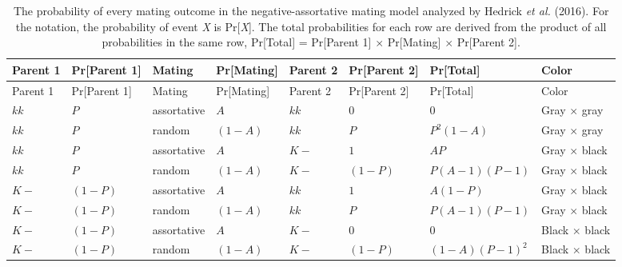 \documentclass[
]{article}
\begin{document}
\begin{longtable}[]{@{}llllllll@{}}
\caption{\label{tab:probabilities}The probability of every mating outcome in the negative-assortative mating model analyzed by Hedrick \emph{et al.} (2016). For the notation, the probability of event \emph{X} is Pr{[}\emph{X}{]}. The total probabilities for each row are derived from the product of all probabilities in the same row, Pr{[}Total{]} = Pr{[}Parent 1{]} \(\times\) Pr{[}Mating{]} \(\times\) Pr{[}Parent 2{]}.}\tabularnewline
\toprule
Parent 1 & Pr{[}Parent 1{]} & Mating & Pr{[}Mating{]} & Parent 2 & Pr{[}Parent 2{]} & Pr{[}Total{]} & Color \\
\midrule
\endfirsthead
\toprule
Parent 1 & Pr{[}Parent 1{]} & Mating & Pr{[}Mating{]} & Parent 2 & Pr{[}Parent 2{]} & Pr{[}Total{]} & Color \\
\midrule
\endhead
\(kk\) & \(P\) & assortative & \(A\) & \(kk\) & \(0\) & \(0\) & Gray \(\times\) gray \\
\(kk\) & \(P\) & random & \((1 - A)\) & \(kk\) & \(P\) & \(P ^ 2 (1 - A)\) & Gray \(\times\) gray \\
\(kk\) & \(P\) & assortative & \(A\) & \(K-\) & \(1\) & \(A P\) & Gray \(\times\) black \\
\(kk\) & \(P\) & random & \((1 - A)\) & \(K-\) & \((1 - P)\) & \(P (A - 1) (P - 1)\) & Gray \(\times\) black \\
\(K-\) & \((1 - P)\) & assortative & \(A\) & \(kk\) & \(1\) & \(A (1 - P)\) & Gray \(\times\) black \\
\(K-\) & \((1 - P)\) & random & \((1 - A)\) & \(kk\) & \(P\) & \(P (A - 1) (P - 1)\) & Gray \(\times\) black \\
\(K-\) & \((1 - P)\) & assortative & \(A\) & \(K-\) & \(0\) & \(0\) & Black \(\times\) black \\
\(K-\) & \((1 - P)\) & random & \((1 - A)\) & \(K-\) & \((1 - P)\) & \((1 - A) (P - 1) ^ 2\) & Black \(\times\) black \\
\bottomrule
\end{longtable}
\end{document}

